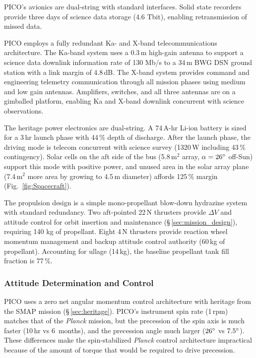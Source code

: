 PICO's avionics are dual-string with standard interfaces. Solid state
recorders provide three days of science data storage (4.6 Tbit), enabling
retransmission of missed data.

PICO employs a fully redundant Ka- and X-band telecommunications
architecture. The Ka-band system uses a 0.3\,m high-gain antenna to
support a science data downlink information rate of 130 Mb/s to a
34\,m BWG DSN ground station with a link margin of 4.8\,dB. The X-band
system provides command and engineering telemetry communication
through all mission phases using medium and low gain
antennas. Amplifiers, switches, and all three antennas are on a
gimballed platform, enabling Ka and X-band downlink concurrent with
science observations.

 The heritage power electronics are dual-string.
A 74\,A-hr Li-ion battery is sized for a 3\,hr launch phase with 44\,\% depth of discharge. 
After the launch phase, the driving
mode is telecom concurrent with science survey (1320\,W including 43\,\% contingency). 
Solar cells on the aft side of the bus (5.8\,m$^2$ array, $\alpha=26^\circ$ off-Sun) support this mode with positive power,  and unused area in the solar array plane (7.4\,m$^2$ more area by growing to 4.5\,m diameter) affords 125\,\% margin
(Fig.~\ref{fig:Spacecraft}).

The propulsion design is a simple mono-propellant blow-down hydrazine
system with standard redundancy. Two aft-pointed 22\,N thrusters
provide $\Delta V$ and attitude control for orbit insertion and
maintenance (\S\,\ref{sec:mission_design}), requiring 140 kg of
propellant.  Eight 4\,N thrusters provide reaction wheel momentum
management and backup attitude control authority (60\,kg of
propellant). Accounting for ullage (14\,kg), the baseline propellant
tank fill fraction is 77\,\%.


\subsubsection{Attitude Determination and Control}
\label{sec:attitude_determination} %

PICO uses a zero net angular momentum control architecture with
heritage from the SMAP mission (\S\,\ref{sec:heritage}). PICO's instrument
spin rate (1\,rpm) matches that of the \textit{Planck} mission, but
the precession of the spin axis is much faster (10\,hr vs 6\, months),
and the precession angle much larger ($26^\circ$ vs
$7.5^\circ$). These differences make the spin-stabilized
\textit{Planck} control architecture impractical because of the amount
of torque that would be required to drive precession.

